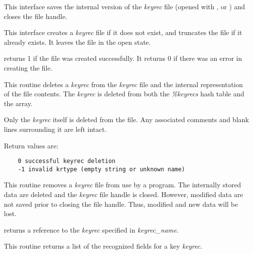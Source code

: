 \begin{description}
\item {}

This interface saves the internal version of the {\it keyrec} file (opened
with ,  or )
and closes the file handle.

\item {}

This interface creates a {\it keyrec} file if it does not exist, and truncates
the file if it already exists.  It leaves the file in the open state.

 returns 1 if the file was created successfully.
It returns 0 if there was an error in creating the file.

\item {}

This routine deletes a {\it keyrec} from the {\it keyrec} file and the internal
representation of the file contents.  The {\it keyrec} is deleted from both
the {\it \%keyrecs} hash table and the {\it \@keyreclines} array.

Only the {\it keyrec} itself is deleted from the file.  Any associated comments
and blank lines surrounding it are left intact.

Return values are:

\begin{verbatim}
    0 successful keyrec deletion
    -1 invalid krtype (empty string or unknown name)
\end{verbatim}

\item {}

This routine removes a {\it keyrec} file from use by a program.  The internally
stored data are deleted and the {\it keyrec} file handle is closed.  However,
modified data are not saved prior to closing the file handle.  Thus, modified
and new data will be lost.

\item {}

 returns a reference to the {\it keyrec} specified in
{\it keyrec\_name}.

\item {}

This routine returns a list of the recognized fields for a key {\it keyrec}.

\item {}


\end{description}
